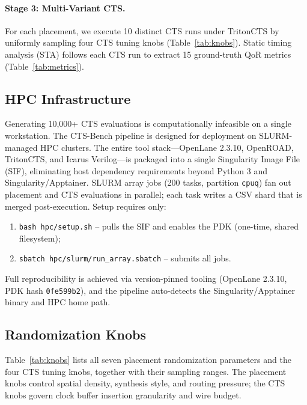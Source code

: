 \documentclass[acmsmall,review,anonymous]{acmart}
\begin{document}
\paragraph{Stage 3: Multi-Variant CTS.}
For each placement, we execute 10 distinct CTS runs under TritonCTS by
uniformly sampling four CTS tuning knobs (Table~\ref{tab:knobs}). Static
timing analysis (STA) follows each CTS run to extract 15 ground-truth QoR
metrics (Table~\ref{tab:metrics}).

\subsection{HPC Infrastructure}

Generating 10,000+ CTS evaluations is computationally infeasible on a
single workstation.
The CTS-Bench pipeline is designed for deployment on SLURM-managed HPC
clusters.
The entire tool stack---OpenLane 2.3.10, OpenROAD, TritonCTS, and Icarus
Verilog---is packaged into a single Singularity Image File (SIF), eliminating
host dependency requirements beyond Python 3 and Singularity/Apptainer.
SLURM array jobs (200 tasks, partition \texttt{cpuq}) fan out placement and
CTS evaluations in parallel; each task writes a CSV shard that is merged
post-execution. Setup requires only:
\begin{enumerate}[leftmargin=*,topsep=2pt,itemsep=0pt]
  \item \texttt{bash hpc/setup.sh} -- pulls the SIF and enables the PDK
    (one-time, shared filesystem);
  \item \texttt{sbatch hpc/slurm/run\_array.sbatch} -- submits all jobs.
\end{enumerate}
Full reproducibility is achieved via version-pinned tooling
(OpenLane 2.3.10, PDK hash \texttt{0fe599b2}), and the pipeline
auto-detects the Singularity/Apptainer binary and HPC home path.

\subsection{Randomization Knobs}

Table~\ref{tab:knobs} lists all seven placement randomization parameters and
the four CTS tuning knobs, together with their sampling ranges. The placement
knobs control spatial density, synthesis style, and routing pressure; the CTS
knobs govern clock buffer insertion granularity and wire budget.
\end{document}
